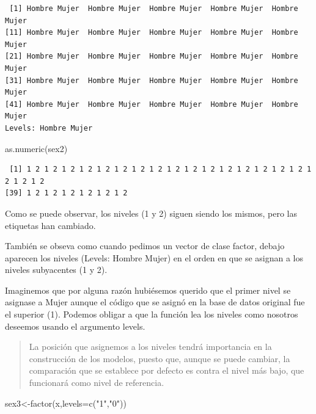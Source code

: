 \documentclass[
  letterpaper,
  DIV=11,
  numbers=noendperiod]{scrreprt}
\newenvironment{Shaded}{\begin{snugshade}}{\end{snugshade}}
\newcommand{\AttributeTok}[1]{\textcolor[rgb]{0.40,0.45,0.13}{#1}}
\newcommand{\FunctionTok}[1]{\textcolor[rgb]{0.28,0.35,0.67}{#1}}
\newcommand{\NormalTok}[1]{\textcolor[rgb]{0.00,0.23,0.31}{#1}}
\newcommand{\OtherTok}[1]{\textcolor[rgb]{0.00,0.23,0.31}{#1}}
\newcommand{\StringTok}[1]{\textcolor[rgb]{0.13,0.47,0.30}{#1}}
\begin{document}
\begin{verbatim}
 [1] Hombre Mujer  Hombre Mujer  Hombre Mujer  Hombre Mujer  Hombre Mujer 
[11] Hombre Mujer  Hombre Mujer  Hombre Mujer  Hombre Mujer  Hombre Mujer 
[21] Hombre Mujer  Hombre Mujer  Hombre Mujer  Hombre Mujer  Hombre Mujer 
[31] Hombre Mujer  Hombre Mujer  Hombre Mujer  Hombre Mujer  Hombre Mujer 
[41] Hombre Mujer  Hombre Mujer  Hombre Mujer  Hombre Mujer  Hombre Mujer 
Levels: Hombre Mujer
\end{verbatim}

\begin{Shaded}
\begin{Highlighting}[]
\FunctionTok{as.numeric}\NormalTok{(sex2)}
\end{Highlighting}
\end{Shaded}

\begin{verbatim}
 [1] 1 2 1 2 1 2 1 2 1 2 1 2 1 2 1 2 1 2 1 2 1 2 1 2 1 2 1 2 1 2 1 2 1 2 1 2 1 2
[39] 1 2 1 2 1 2 1 2 1 2 1 2
\end{verbatim}

Como se puede observar, los niveles (1 y 2) siguen siendo los mismos,
pero las etiquetas han cambiado.

También se obseva como cuando pedimos un vector de clase factor, debajo
aparecen los niveles (Levels: Hombre Mujer) en el orden en que se
asignan a los niveles subyacentes (1 y 2).

Imaginemos que por alguna razón hubiésemos querido que el primer nivel
se asignase a Mujer aunque el código que se asignó en la base de datos
original fue el superior (1). Podemos obligar a que la función lea los
niveles como nosotros deseemos usando el argumento levels.

\begin{quote}
La posición que asignemos a los niveles tendrá importancia en la
construcción de los modelos, puesto que, aunque se puede cambiar, la
comparación que se establece por defecto es contra el nivel más bajo,
que funcionará como nivel de referencia.
\end{quote}

\begin{Shaded}
\begin{Highlighting}[]
\NormalTok{sex3}\OtherTok{\textless{}{-}}\FunctionTok{factor}\NormalTok{(x,}\AttributeTok{levels=}\FunctionTok{c}\NormalTok{(}\StringTok{"1"}\NormalTok{,}\StringTok{"0"}\NormalTok{))}
\end{Highlighting}
\end{Shaded}
\end{document}

